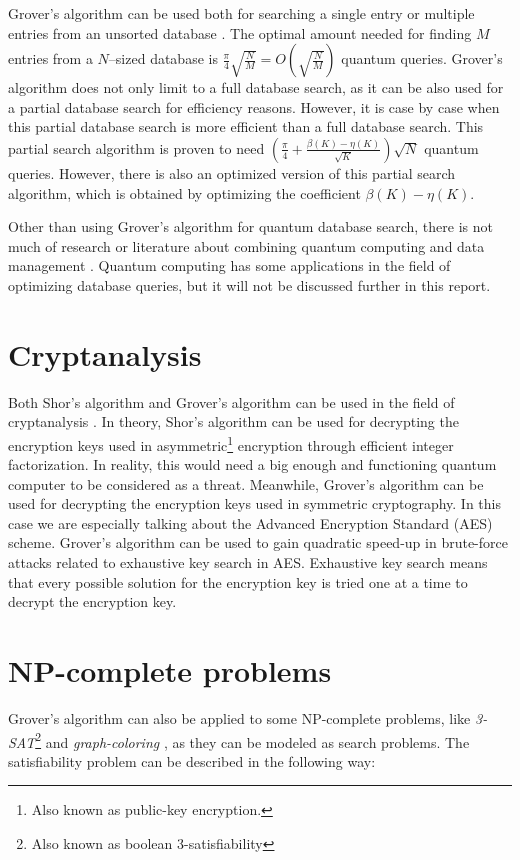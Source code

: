 \documentclass[english,oneside,openright]{UH_DS_report}
\begin{document}
Grover's algorithm can be used both for searching a single entry or multiple entries from an unsorted database \cite{giri2017review}. The optimal amount needed for finding $M$ entries from a $N$--sized database is $\frac{\pi}{4}\sqrt{\frac{N}{M}} = O(\sqrt{\frac{N}{M}})$ quantum queries. Grover's algorithm does not only limit to a full database search, as it can be also used for a partial database search for efficiency reasons. However, it is case by case when this partial database search is more efficient than a full database search. This partial search algorithm is proven to need $(\frac{\pi}{4}+\frac{\beta (K) - \eta (K)}{\sqrt{K}})\sqrt{N}$ quantum queries. However, there is also an optimized version of this partial search algorithm, which is obtained by optimizing the coefficient $\beta (K) - \eta (K)$.

Other than using Grover's algorithm for quantum database search, there is not much of research or literature about combining quantum computing and data management \cite{qcdb}. Quantum computing has some applications in the field of optimizing database queries, but it will not be discussed further in this report.

\section{Cryptanalysis}

Both Shor's algorithm and Grover's algorithm can be used in the field of cryptanalysis \cite{grassl2016applying}. In theory, Shor's algorithm can be used for decrypting the encryption keys used in asymmetric\footnote{Also known as public-key encryption.} encryption through efficient integer factorization. In reality, this would need a big enough and functioning quantum computer to be considered as a threat. Meanwhile, Grover's algorithm can be used for decrypting the encryption keys used in symmetric cryptography. In this case we are especially talking about the Advanced Encryption Standard (AES) scheme. Grover's algorithm can be used to gain quadratic speed-up in brute-force attacks related to exhaustive key search in AES. Exhaustive key search means that every possible solution for the encryption key is tried one at a time to decrypt the encryption key.

\section{NP-complete problems}
Grover's algorithm can also be applied to some NP-complete problems, like \emph{3-SAT}\footnote{Also known as boolean 3-satisfiability} \cite{ambainis2004quantum} and \emph{graph-coloring} \cite{introtoqc}, as they can be modeled as search problems. The satisfiability problem can be described in the following way:
\end{document}
